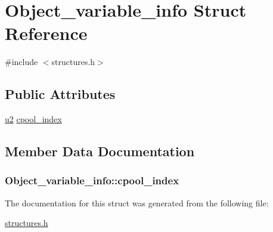\hypertarget{structObject__variable__info}{}\section{Object\+\_\+variable\+\_\+info Struct Reference}
\label{structObject__variable__info}


{\ttfamily \#include $<$structures.\+h$>$}

\subsection*{Public Attributes}
\begin{DoxyCompactItemize}
\item 
\hyperlink{structures_8h_a55ef8d87fd202b8417704c089899c5b9}{u2} \hyperlink{structObject__variable__info_a0588843a5e59b67c1732ed9f6b5eb5a0}{cpool\+\_\+index}
\end{DoxyCompactItemize}


\subsection{Member Data Documentation}
\subsubsection[{\texorpdfstring{cpool\+\_\+index}{cpool_index}}]{ Object\+\_\+variable\+\_\+info\+::cpool\+\_\+index}\hypertarget{structObject__variable__info_a0588843a5e59b67c1732ed9f6b5eb5a0}{}\label{structObject__variable__info_a0588843a5e59b67c1732ed9f6b5eb5a0}


The documentation for this struct was generated from the following file\+:\begin{DoxyCompactItemize}
\item 
\hyperlink{structures_8h}{structures.\+h}\end{DoxyCompactItemize}
